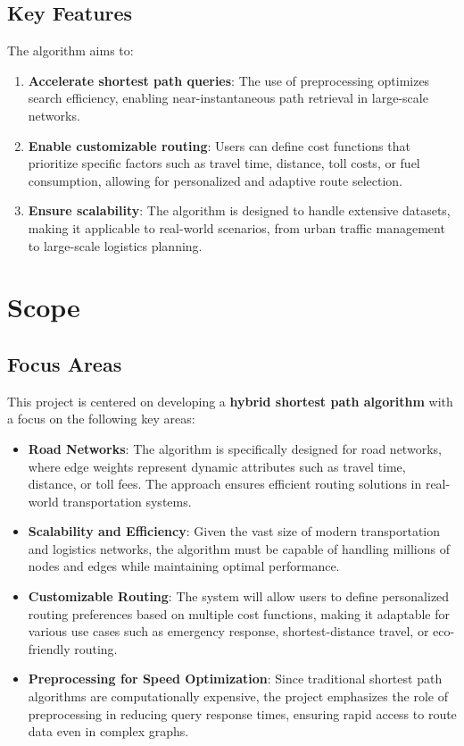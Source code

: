 \documentclass{article}
\begin{document}
	\subsection{Key Features}
	The algorithm aims to:
	\begin{enumerate}
		\item \textbf{Accelerate shortest path queries}: The use of preprocessing optimizes search efficiency, enabling near-instantaneous path retrieval in large-scale networks.
		\item \textbf{Enable customizable routing}: Users can define cost functions that prioritize specific factors such as travel time, distance, toll costs, or fuel consumption, allowing for personalized and adaptive route selection.
		\item \textbf{Ensure scalability}: The algorithm is designed to handle extensive datasets, making it applicable to real-world scenarios, from urban traffic management to large-scale logistics planning.
	\end{enumerate}
	
	\section{Scope}
	
	\subsection{Focus Areas}
	This project is centered on developing a \textbf{hybrid shortest path algorithm} with a focus on the following key areas:
	\begin{itemize}
		\item \textbf{Road Networks}: The algorithm is specifically designed for road networks, where edge weights represent dynamic attributes such as travel time, distance, or toll fees. The approach ensures efficient routing solutions in real-world transportation systems.
		\item \textbf{Scalability and Efficiency}: Given the vast size of modern transportation and logistics networks, the algorithm must be capable of handling millions of nodes and edges while maintaining optimal performance.
		\item \textbf{Customizable Routing}: The system will allow users to define personalized routing preferences based on multiple cost functions, making it adaptable for various use cases such as emergency response, shortest-distance travel, or eco-friendly routing.
		\item \textbf{Preprocessing for Speed Optimization}: Since traditional shortest path algorithms are computationally expensive, the project emphasizes the role of preprocessing in reducing query response times, ensuring rapid access to route data even in complex graphs.
	\end{itemize}
\end{document}
